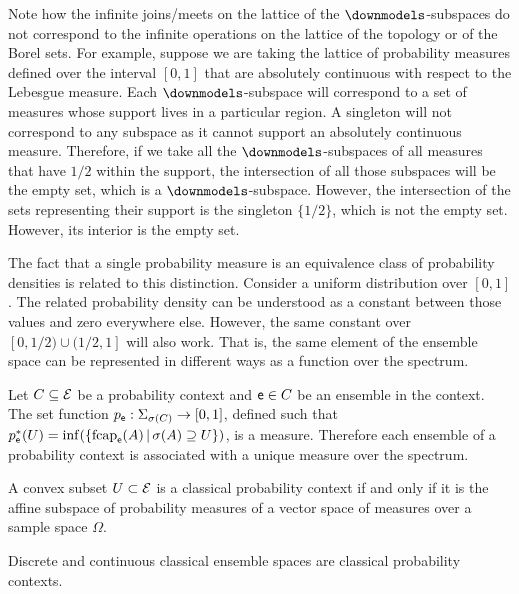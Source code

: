 	\begin{remark}
		Note how the infinite joins/meets on the lattice of the $\separate$-subspaces do not correspond to the infinite operations on the lattice of the topology or of the Borel sets. For example, suppose we are taking the lattice of probability measures defined over the interval $[0,1]$ that are absolutely continuous with respect to the Lebesgue measure. Each $\separate$-subspace will correspond to a set of measures whose support lives in a particular region. A singleton will not correspond to any subspace as it cannot support an absolutely continuous measure. Therefore, if we take all the $\separate$-subspaces of all measures that have $1/2$ within the support, the intersection of all those subspaces will be the empty set, which is a $\separate$-subspace. However, the intersection of the sets representing their support is the singleton $\{1/2\}$, which is not the empty set. However, its interior is the empty set.
		
		The fact that a single probability measure is an equivalence class of probability densities is related to this distinction. Consider a uniform distribution over $[0,1]$. The related probability density can be understood as a constant between those values and zero everywhere else. However, the same constant over $[0,1/2) \cup (1/2,1]$ will also work. That is, the same element of the ensemble space can be represented in different ways as a function over the spectrum.
	\end{remark}

\begin{conj}
	Let $C \subseteq \mathcal{E}$ be a probability context and $\mathsf{e} \in C$ be an ensemble in the context. The set function $p_{\mathsf{e}} : \Sigma_{\sigma(C)} \to[0,1]$, defined such that $p^*_{\mathsf{e}}(U) = \inf(\{ \mathrm{fcap}_{\mathsf{e}}(A) \, | \, \sigma(A) \supseteq U \})$, is a measure. Therefore each ensemble of a probability context is associated with a unique measure over the spectrum.
\end{conj}

\begin{conj}
	A convex subset $U \subset \mathcal{E}$ is a classical probability context if and only if it is the affine subspace of probability measures of a vector space of measures over a sample space $\Omega$.
\end{conj}

\begin{conj}
	Discrete and continuous classical ensemble spaces are classical probability contexts.
\end{conj}

